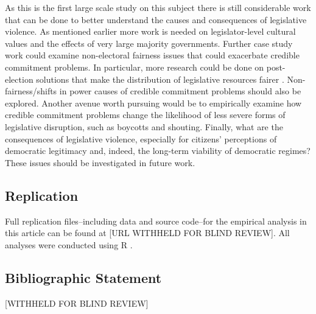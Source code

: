 \documentclass[a4paper]{article}\usepackage[]{graphicx}\usepackage[]{color}
\begin{document}
As this is the first large scale study on this subject there is still considerable work that can be done to better understand the causes and consequences of legislative violence. As mentioned earlier more work is needed on legislator-level cultural values and the effects of very large majority governments. Further case study work could examine non-electoral fairness issues that could exacerbate credible commitment problems. In particular, more research could be done on post-election solutions that make the distribution of legislative resources fairer \cite[for example see][who examined informal minority party access to power in Japan's Diet]{Wolfe2004}. Non-fairness/shifts in power causes of credible commitment problems should also be explored. Another avenue worth pursuing would be to empirically examine how credible commitment problems change the likelihood of less severe forms of legislative disruption, such as boycotts and shouting. Finally, what are the consequences of legislative violence, especially for citizens' perceptions of democratic legitimacy and, indeed, the long-term viability of democratic regimes? These issues should be investigated in future work.

\subsection*{Replication}

\noindent Full replication files--including data and source code--for the empirical analysis in this article can be found at
[URL WITHHELD FOR BLIND REVIEW]. All analyses were conducted using R \citep{R-cite}.






\subsection*{Bibliographic Statement}

[WITHHELD FOR BLIND REVIEW]
\end{document}
